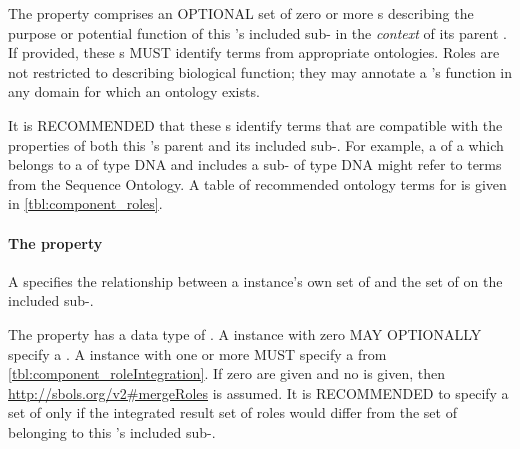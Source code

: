 The  property comprises an OPTIONAL set of zero or more  s describing the purpose or potential function of this 's included sub- in the \textit{context} of its parent .
If provided, these  s MUST identify terms from appropriate ontologies. Roles are not restricted to describing biological function; they may annotate a 's function in any domain for which an ontology exists.

It is RECOMMENDED that these  s identify terms that are compatible with the  properties of both this 's parent  and its included sub-. For example, a  of a  which belongs to a  of type DNA and includes a sub- of type DNA might refer to terms from the Sequence Ontology. A table of recommended ontology terms for  is given in \ref{tbl:component_roles}.



\paragraph{The  property}\label{sec:roleIntegration:C}


A  specifies the relationship between a  instance's own set of  and the set of  on the included sub-.

The  property has a data type of . A  instance with zero  MAY OPTIONALLY specify a . A  instance with one or more  MUST specify a  from \ref{tbl:component_roleIntegration}.
If zero   are given and no   is given, then \url{http://sbols.org/v2\#mergeRoles} is assumed.
It is RECOMMENDED to specify a set of   only if the integrated result set of roles would differ from the set of  belonging to this 's included sub-.


